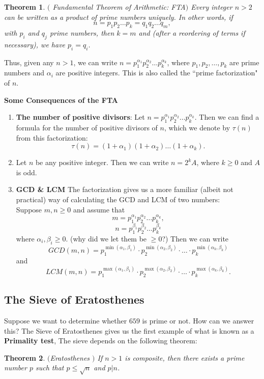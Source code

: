\documentclass[12pt]{article}
\theoremstyle{plain}
\newtheorem{theorem}{Theorem}
\theoremstyle{definition}
\theoremstyle{remark}
\begin{document}
\bigskip
\noindent
\begin{theorem}$($ Fundamental Theorem of Arithmetic: FTA$)$ Every integer $n>2$ can be written as a product of prime numbers uniquely. In other words, if $$n=p_1p_2\dots p_k = q_1q_2\dots q_m,$$ with $p_i$ and $q_j$ prime numbers, then $k=m$ and (after a reordering of terms if necessary), we have $p_i=q_i$.
\end{theorem}

\bigskip
\noindent
Thus, given any $n>1$, we can write $n=p_1^{\alpha_1}p_2^{\alpha_2} \dots p_k^{\alpha_k}$, where $p_1, p_2, \dots, p_k$ are prime numbers and $\alpha_i$ are positive integers. This is also called the ``prime factorization" of $n$.

\bigskip
\noindent
{\bf Some Consequences of the FTA}
\\
\begin{enumerate}
    \item {\bf The number of positive divisors}: Let $n=p_1^{\alpha_1}p_2^{\alpha_2} \dots p_k^{\alpha_k}$. Then we can find a formula for the number of positive divisors of $n$, which we denote by $\tau(n)$ from this factorization:
    $$\tau(n)=(1+\alpha_1)(1+\alpha_2)\dots (1+\alpha_k).$$
    \item Let $n$ be any positive integer. Then we can write $n=2^kA$, where $k\geq 0$ and $A$ is odd.
    \item {\bf GCD \& LCM} The factorization gives us a more familiar (albeit not practical) way of calculating the GCD and LCM of two numbers:
\\
Suppose $m,n \geq 0$ and assume that
$$m=p_1^{\alpha_1}p_2^{\alpha_2} \dots p_k^{\alpha_k},$$
$$n=p_1^{\beta_1}p_2^{\beta_2} \dots p_k^{\beta_k}$$
where $\alpha_i, \beta_i \geq 0$. (why did we let them be $\geq 0$?)
Then we can write
$$GCD(m,n) = p_1^{\min(\alpha_1, \beta_1)}\cdot p_2^{\min(\alpha_2, \beta_2)} \cdot \dots \cdot p_k^{\min(\alpha_k, \beta_k)}$$
and
$$LCM(m,n) = p_1^{\max(\alpha_1, \beta_1)}\cdot p_2^{\max(\alpha_2, \beta_2)} \cdot \dots \cdot p_k^{\max(\alpha_k, \beta_k)}.$$
\end{enumerate}

\subsection{The Sieve of Eratosthenes}
Suppose we want to determine whether $659$ is prime or not. How can we answer this? The Sieve of Eratosthenes gives us the first example of what is known as a {\bf Primality test}, The sieve depends on the following theorem:
\begin{theorem} $($Eratosthenes $)$
If $n>1$ is composite, then there exists a prime number $p$ such that $p\leq \sqrt{n}$ and $p|n$.
\end{theorem}
\end{document}
